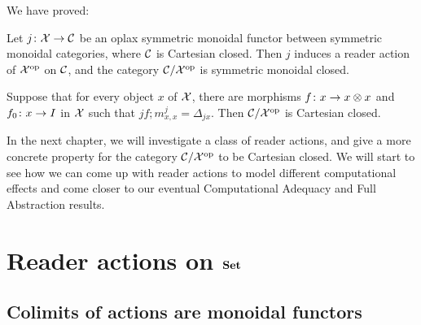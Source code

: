 We have proved:

\begin{theorem}
  Let $j\colon \mathcal X \to {\mathcal{C}}$ be an oplax symmetric monoidal functor between symmetric monoidal categories, where ${\mathcal{C}}$ is Cartesian closed.  
  Then $j$ induces a reader action of $\mathcal X^{\mathrm{op}}$ on ${\mathcal{C}}$, and the category ${\mathcal{C}}/\mathcal X^{\mathrm{op}}$ is symmetric monoidal closed.

  Suppose that for every object $x$ of $\mathcal X$, there are morphisms $f \colon x \to x\otimes x$ and $f_0 \colon x \to I$ in $\mathcal X$ such that $jf;m^j_{x,x}=\Delta_{jx}$.
  Then ${\mathcal{C}}/\mathcal X^{\mathrm{op}}$ is Cartesian closed.
  \label{TheCartesianClosedCx}
\end{theorem}

In the next chapter, we will investigate a class of reader actions, and give a more concrete property for the category ${\mathcal{C}}/\mathcal X^{\mathrm{op}}$ to be Cartesian closed.
We will start to see how we can come up with reader actions to model different computational effects and come closer to our eventual Computational Adequacy and Full Abstraction results.

\chapter{Reader actions on ${\normalfont\textbf{Set}}$}
\label{ChapReaderActions}

\section{Colimits of actions are monoidal functors}


